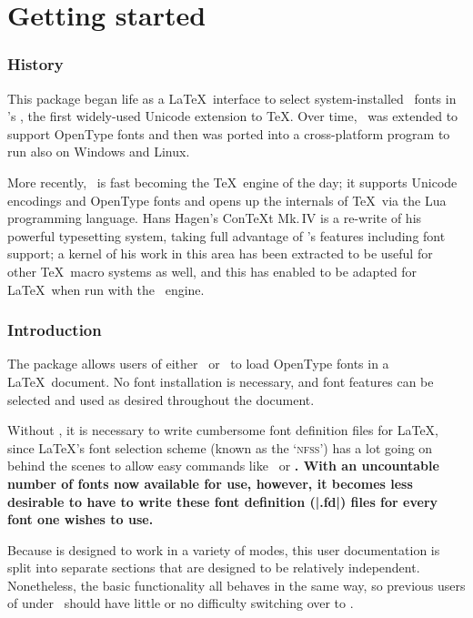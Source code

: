 \documentclass[a4paper]{l3doc}
\begin{document}
\part{Getting started}

\section{History}

This package began life as a \LaTeX\ interface to select system-installed
\MacOSX\ fonts in 's \XeTeX, the first widely-used
Unicode extension to \TeX. Over time, \XeTeX\ was extended to support OpenType
fonts and then was ported into a cross-platform program to run also on Windows
and Linux.

More recently, \LuaTeX\ is fast becoming the \TeX\ engine of the day; it
supports Unicode encodings and OpenType fonts and opens up the internals of
\TeX\ via the Lua programming language. Hans Hagen's Con\TeX t Mk.\,IV is a
re-write of his powerful typesetting system, taking full advantage of
\LuaTeX's features including font support; a kernel of his work in this area
has been extracted to be useful for other \TeX\ macro systems as well, and
this has enabled  to be adapted for \LaTeX\ when run with the
\LuaTeX\ engine.



\section{Introduction}

The  package allows users of either \XeTeX\ or \LuaTeX\ to
load OpenType fonts in a \LaTeX\ document. No font installation is necessary,
and font features can be selected and used as desired throughout the document.

Without , it is necessary to write cumbersome font definition
files for \LaTeX, since \LaTeX's font selection scheme (known as the
`\textsc{nfss}') has a lot going on behind the scenes to allow easy
commands like \cmd\emph\ or \cmd\bfseries. With an uncountable number of
fonts now available for use, however, it becomes less desirable to have to
write these font definition (|.fd|) files for every font one wishes to use.

Because  is designed to work in a variety of modes, this
user documentation is split into separate sections that are designed to be
relatively independent. Nonetheless, the basic functionality all behaves in
the same way, so previous users of  under \XeTeX\ should have
little or no difficulty switching over to \LuaTeX.
\end{document}
